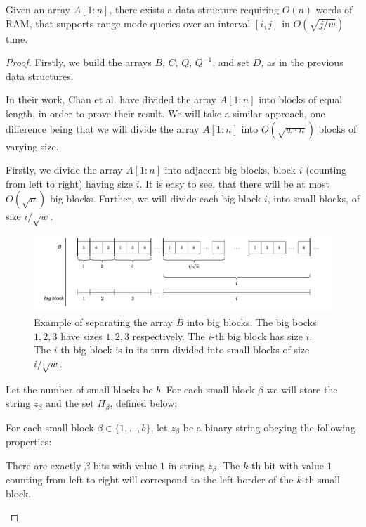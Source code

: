 \documentclass[runningheads]{llncs}
\begin{document}
\begin{lemma}
    Given an array $A[1:n]$, there exists a data structure requiring $O(n)$ words of RAM, that supports 
    range mode queries over an interval $[i,j]$ in $O( \sqrt{j/w}  )$ time.    
\end{lemma}
\begin{proof}
    Firstly, we build the arrays $B$, $C$, $Q$, $Q^{-1}$, and set $D$, as in the previous data structures.
    
    In their work, Chan et al.\cite{chan2014linear} have divided the array $A[1:n]$ into blocks of equal length, in order to prove their result.
    We will take a similar approach, one difference being that we will divide the array $A[1:n]$ into $O(\sqrt{w\cdot n})$ blocks of varying size.

    Firstly, we divide the array $A[1:n]$ into adjacent big blocks, block $i$ (counting from left to right) having size $i$. It is easy to see, that there will be at most $O(\sqrt{n})$ big blocks.
    Further, we will divide each big block $i$, into small blocks, of size $i/\sqrt{w}$.
    
    
    \begin{figure}[H]
        \centering
        \hspace*{-0.5cm}      
        \includegraphics[scale=0.55]{figures/example_figure4.pdf}
        \caption{ Example of separating the array $B$ into big blocks. The big bocks $1,2,3$ have sizes $1,2,3$ respectively. The $i$-th big block has size $i$. 
        The $i$-th big block is in its turn divided into small blocks of size $i/\sqrt{w}$.}
        \label{fig:fig4}
    \end{figure}
    
    
    
    Let the number of small blocks be $b$. For each small block $\beta$ we will store the string $z_{\beta}$ and the set $H_{\beta}$, defined below:
    \begin{definition}
        For each small block $\beta\in\{1,\dots , b\}$, let $z_\beta$ be a binary string obeying the following properties:
        \begin{property}
            There are exactly $\beta$ bits with value $1$ in string $z_{\beta}$. The $k$-th bit with value $1$ counting from left to right will correspond to the left border of the $k$-th small block.    
        \end{property}


\end{definition}
\end{proof}
\end{document}
